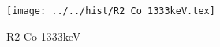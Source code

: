 \begin{figure}[h] \centering\texttt{[image: ../../hist/R2\_Co\_1333keV.tex]}\caption{R2 Co 1333keV}\label{hist:R2_Co_1333keV} \end{figure}
